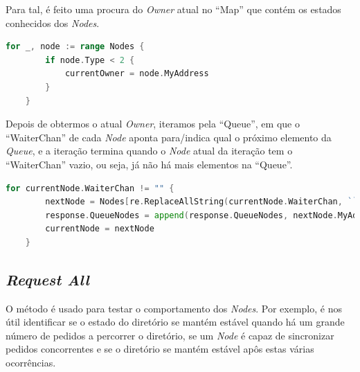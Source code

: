 Para tal, é feito uma procura do \emph{Owner} atual no ``Map'' que contém os estados conhecidos dos \emph{Nodes}.

\begin{lstlisting}[caption={Iteração pelo ``Map'' ``Nodes'', para procurar o atual \emph{Owner} },language=Go]
	for _, node := range Nodes {
		if node.Type < 2 {
			currentOwner = node.MyAddress
		}
	}

\end{lstlisting}

Depois de obtermos o atual \emph{Owner}, iteramos pela ``Queue'', em que o ``WaiterChan'' de cada \emph{Node}
aponta para/indica qual o próximo elemento da \emph{Queue}, e a iteração termina quando o \emph{Node} atual da iteração tem o ``WaiterChan'' vazio, ou seja, já não há mais elementos na ``Queue''.

\begin{lstlisting}[caption={Iteração pela ``Queue'', usando o ``WaiterChan'' dos \emph{Nodes}},language=Go]
	for currentNode.WaiterChan != "" {
		nextNode = Nodes[re.ReplaceAllString(currentNode.WaiterChan, ``)]
		response.QueueNodes = append(response.QueueNodes, nextNode.MyAddress)
		currentNode = nextNode
	}

\end{lstlisting}

\subsection*{\emph{Request All}}

O método é usado para testar o comportamento dos \emph{Nodes}.
Por exemplo, é nos útil identificar se o estado do diretório se mantém estável quando há um grande número de
pedidos a percorrer o diretório, se um \emph{Node} é capaz de sincronizar pedidos concorrentes e se o diretório se mantém estável apôs estas várias ocorrências.

